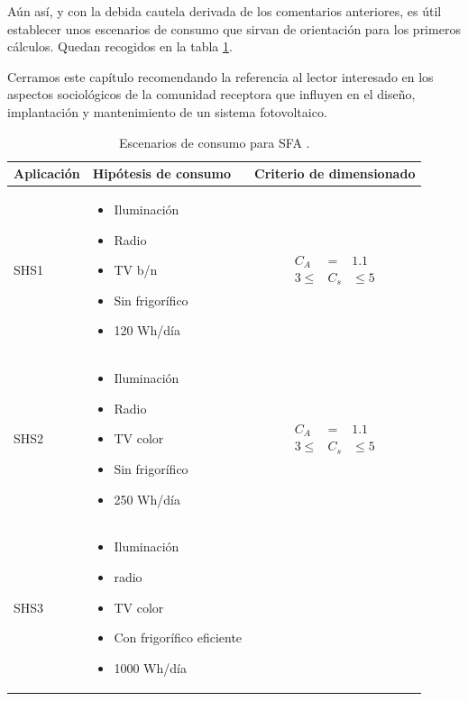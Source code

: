 Aún así, y con la debida cautela derivada de los comentarios anteriores,
es útil establecer unos escenarios de consumo que sirvan de orientación
para los primeros cálculos. Quedan recogidos en la tabla \ref{tab:Escenarios-de-consumo}. 

Cerramos este capítulo recomendando la referencia \cite{IngenieriaSinFronteras1999}
al lector interesado en los aspectos sociológicos de la comunidad
receptora que influyen en el diseño, implantación y mantenimiento
de un sistema fotovoltaico.

%
\begin{table}
\caption[Escenarios de consumo para SFA.]{Escenarios de consumo para SFA \cite{Lorenzo2006c}.\label{tab:Escenarios-de-consumo}}


\begin{tabular}{>{\centering}p{2cm}>{\centering}p{6cm}>{\centering}p{3cm}}
\toprule 
Aplicación & Hipótesis de consumo & Criterio de dimensionado\tabularnewline
\midrule
\midrule 
SHS1 & \begin{itemize}
\item Iluminación
\item Radio 
\item TV b/n
\item Sin frigorífico
\item 120 Wh/día
\end{itemize}
 & \begin{eqnarray*}
C_{A} & = & 1.1\\
3\leq & C_{s} & \leq5\end{eqnarray*}
\tabularnewline
\midrule 
SHS2 & \begin{itemize}
\item Iluminación
\item Radio
\item TV color
\item Sin frigorífico
\item 250 Wh/día
\end{itemize}
 & \begin{eqnarray*}
C_{A} & = & 1.1\\
3\leq & C_{s} & \leq5\end{eqnarray*}
\tabularnewline
\midrule 
SHS3 & \begin{itemize}
\item Iluminación
\item radio
\item TV color
\item Con frigorífico eficiente
\item 1000 Wh/día

\end{itemize}
\end{tabular}
\end{table}
